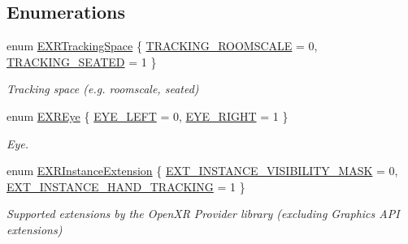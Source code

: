 \subsection*{Enumerations}
\begin{DoxyCompactItemize}
\item 
enum \mbox{\hyperlink{namespace_open_x_r_provider_a005dd91723b05b123b8fccbc41798b05}{E\+X\+R\+Tracking\+Space}} \{ \mbox{\hyperlink{namespace_open_x_r_provider_a005dd91723b05b123b8fccbc41798b05a5f2a13c525612f19c5c2a6db5f22f836}{T\+R\+A\+C\+K\+I\+N\+G\+\_\+\+R\+O\+O\+M\+S\+C\+A\+LE}} = 0, 
\mbox{\hyperlink{namespace_open_x_r_provider_a005dd91723b05b123b8fccbc41798b05aba26293ac81cbb568b44ae10f4af4ec9}{T\+R\+A\+C\+K\+I\+N\+G\+\_\+\+S\+E\+A\+T\+ED}} = 1
 \}
\begin{DoxyCompactList}\small\item\em Tracking space (e.\+g. roomscale, seated) \end{DoxyCompactList}\item 
enum \mbox{\hyperlink{namespace_open_x_r_provider_a8aa379869e30772896e6c468eb54f155}{E\+X\+R\+Eye}} \{ \mbox{\hyperlink{namespace_open_x_r_provider_a8aa379869e30772896e6c468eb54f155a1f7295c2ac801bf776369e51ad0f7e84}{E\+Y\+E\+\_\+\+L\+E\+FT}} = 0, 
\mbox{\hyperlink{namespace_open_x_r_provider_a8aa379869e30772896e6c468eb54f155ae4e90da36b75bc313108f4ea7283da97}{E\+Y\+E\+\_\+\+R\+I\+G\+HT}} = 1
 \}
\begin{DoxyCompactList}\small\item\em Eye. \end{DoxyCompactList}\item 
enum \mbox{\hyperlink{namespace_open_x_r_provider_ac7a3555ea86a858a7d56afa5dfb16cc3}{E\+X\+R\+Instance\+Extension}} \{ \mbox{\hyperlink{namespace_open_x_r_provider_ac7a3555ea86a858a7d56afa5dfb16cc3aafc2d84efc5f08ff5b64d1118fc40a6b}{E\+X\+T\+\_\+\+I\+N\+S\+T\+A\+N\+C\+E\+\_\+\+V\+I\+S\+I\+B\+I\+L\+I\+T\+Y\+\_\+\+M\+A\+SK}} = 0, 
\mbox{\hyperlink{namespace_open_x_r_provider_ac7a3555ea86a858a7d56afa5dfb16cc3a07f521c2e1b127d26a5f2e57ebe00a65}{E\+X\+T\+\_\+\+I\+N\+S\+T\+A\+N\+C\+E\+\_\+\+H\+A\+N\+D\+\_\+\+T\+R\+A\+C\+K\+I\+NG}} = 1
 \}
\begin{DoxyCompactList}\small\item\em Supported extensions by the Open\+XR Provider library (excluding Graphics A\+PI extensions) \end{DoxyCompactList}\end{DoxyCompactItemize}
